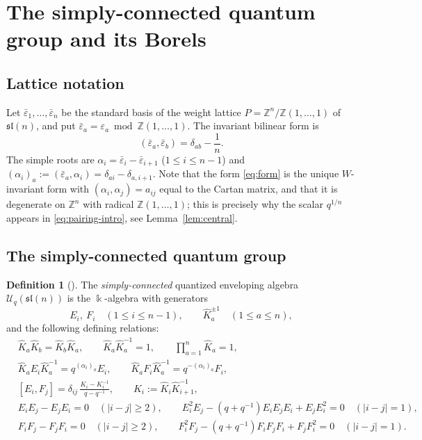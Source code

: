 \documentclass[11pt]{amsart}
\newcommand{\bk}{\Bbbk}
\newcommand{\U}{\mathscr U}
\newcommand{\sl}{\mathfrak{sl}}
\newcommand{\al}{\alpha}
\newcommand{\eps}{\varepsilon}
\theoremstyle{plain}
\theoremstyle{definition}
\newtheorem{definition}[theorem]{Definition}
\numberwithin{equation}{section}
\begin{document}
\section{The simply-connected quantum group and its Borels}\label{sec:prelim}

\subsection{Lattice notation}

Let $\bar\eps_1,\dots,\bar\eps_n$ be the standard basis of the weight lattice
$P=\mathbb Z^n/\mathbb Z(1,\dots,1)$ of $\sl(n)$, and put
$\bar\eps_a=\eps_a\bmod \mathbb Z(1,\dots,1)$.  The invariant bilinear form is
\begin{equation}\label{eq:form}
(\bar\eps_a,\bar\eps_b)=\delta_{ab}-\frac1n .
\end{equation}
The simple roots are $\al_i=\bar\eps_i-\bar\eps_{i+1}$ ($1\le i\le n-1$) and
$(\al_i)_a:=(\bar\eps_a,\al_i)=\delta_{ai}-\delta_{a,i+1}$.  Note that the form
\eqref{eq:form} is the unique $W$-invariant form with
$(\al_i,\al_j)=a_{ij}$ equal to the Cartan matrix, and that it is degenerate on
$\mathbb Z^n$ with radical $\mathbb Z(1,\dots,1)$; this is precisely why the
scalar $q^{1/n}$ appears in \eqref{eq:pairing-intro}, see
Lemma~\ref{lem:central}.

\subsection{The simply-connected quantum group}

\begin{definition}[]\label{def:Uq}
The \emph{simply-connected} quantized enveloping algebra
$\U_q(\sl(n))$ is the $\bk$-algebra with generators
\[
E_i,\ F_i\quad(1\le i\le n-1),\qquad \hat K_a^{\pm1}\quad(1\le a\le n),
\]
and the following defining relations:
\begin{align}
&\hat K_a\hat K_b=\hat K_b\hat K_a,\qquad \hat K_a\hat K_a^{-1}=1,\qquad
\prod_{a=1}^{n}\hat K_a=1, \label{eq:Uq-torus}\\
&\hat K_aE_i\hat K_a^{-1}=q^{(\al_i)_a}E_i,\qquad
\hat K_aF_i\hat K_a^{-1}=q^{-(\al_i)_a}F_i, \label{eq:Uq-conj}\\
&[E_i,F_j]=\delta_{ij}\,\frac{K_i-K_i^{-1}}{q-q^{-1}},\qquad
K_i:=\hat K_i\hat K_{i+1}^{-1},\label{eq:Uq-EF}\\
&E_iE_j-E_jE_i=0\quad(|i-j|\ge2),\qquad
E_i^2E_j-(q+q^{-1})E_iE_jE_i+E_jE_i^2=0\quad(|i-j|=1),\label{eq:SerreE}\\
&F_iF_j-F_jF_i=0\quad(|i-j|\ge2),\qquad
F_i^2F_j-(q+q^{-1})F_iF_jF_i+F_jF_i^2=0\quad(|i-j|=1).\label{eq:SerreF}
\end{align}
\end{definition}
\end{document}
